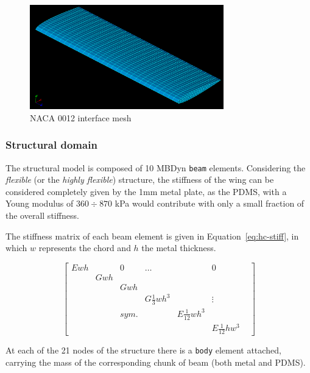 \begin{figure}[htbp!]
	\centering
	\includegraphics[width=0.75\textwidth]{images/heathcote/interface01.png}
	\caption{NACA 0012 interface mesh}
	\label{fig:hc-interface}
\end{figure}


\subsubsection{Structural domain}

The structural model is composed of 10 MBDyn \texttt{beam} elements. Considering the \textit{flexible} (or the \textit{highly flexible}) structure, the stiffness of the wing can be considered completely given by the 1\si{mm} metal plate, as the PDMS, with a Young modulus of $360\div870$ \si{kPa} would contribute with only a small fraction of the overall stiffness.

The stiffness matrix of each beam element is given in Equation~\ref{eq:hc-stiff}, in which $w$ represents the chord and $h$ the metal thickness.

\begin{equation}
    \begin{bmatrix} Ewh &  & 0 & \ldots &  & 0 \\
                          & Gwh &  & & & &  \\
                          & & Gwh & & & \\
                          & & & G\frac{1}{3}wh^3 & & \vdots \\
                          & &  sym. & & E\frac{1}{12}wh^3 &  \\
                          & & & & & E\frac{1}{12}hw^3
    \end{bmatrix} 
    \label{eq:hc-stiff}
\end{equation}

At each of the 21 nodes of the structure there is a \texttt{body} element attached, carrying the mass of the corresponding chunk of beam (both metal and PDMS).

